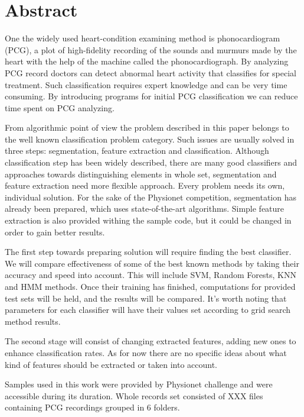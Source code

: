 \documentclass[10pt,a4paper]{article}
\begin{document}
\section{Abstract}
One the widely used heart-condition examining method is phonocardiogram (PCG), a plot of high-fidelity recording of the sounds and murmurs made by the heart with the help of the machine called the phonocardiograph. By analyzing PCG record doctors can detect abnormal heart activity that classifies for special treatment. Such classification requires expert knowledge and can be very time consuming. By introducing programs for initial PCG classification we can reduce time spent on PCG analyzing.

From algorithmic point of view the problem described in this paper belongs to the well known classification problem category. Such issues are usually solved in three steps: segmentation, feature extraction and classification. Although classification step has been widely described, there are many good classifiers and approaches towards distinguishing elements in whole set, segmentation and feature extraction need more flexible approach. Every problem needs its own, individual solution. For the sake of the Physionet competition, segmentation has already been prepared, which uses state-of-the-art algorithms. Simple feature extraction is also provided withing the sample code, but it could be changed in order to gain better results.

The first step towards preparing solution will require finding the best classifier. We will compare effectiveness of some of the best known methods by taking their accuracy and speed into account. This will include SVM, Random Forests, KNN and HMM methods. Once their training has finished, computations for provided test sets will be held, and the results will be compared. It's worth noting that parameters for each classifier will have their values set according to grid search method results.

The second stage will consist of changing extracted features, adding new ones to enhance classification rates. As for now there are no specific ideas about what kind of features should be extracted or taken into account.

Samples used in this work were provided by Physionet challenge and were accessible during its duration. Whole records set consisted of XXX files containing PCG recordings grouped in 6 folders.
\end{document}
